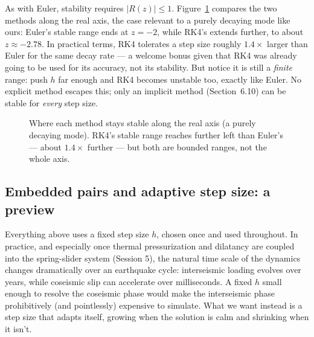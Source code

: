 As with Euler, stability requires $|R(z)|\le1$. Figure~\ref{fig:rk4-vs-euler-stability} compares the two methods along the real axis, the case relevant to a purely decaying mode like ours: Euler's stable range ends at $z=-2$, while RK4's extends further, to about $z\approx-2.78$. In practical terms, RK4 tolerates a step size roughly $1.4\times$ larger than Euler for the same decay rate --- a welcome bonus given that RK4 was already going to be used for its accuracy, not its stability. But notice it is still a \emph{finite} range: push $h$ far enough and RK4 becomes unstable too, exactly like Euler. No explicit method escapes this; only an implicit method (Section~6.10) can be stable for \emph{every} step size.

\begin{figure}[h]
\centering
{}
\caption{Where each method stays stable along the real axis (a purely decaying mode). RK4's stable range reaches further left than Euler's --- about $1.4\times$ further --- but both are bounded ranges, not the whole axis.}
\label{fig:rk4-vs-euler-stability}
\end{figure}

\subsection{Embedded pairs and adaptive step size: a preview}

Everything above uses a fixed step size $h$, chosen once and used throughout. In practice, and especially once thermal pressurization and dilatancy are coupled into the spring-slider system (Session 5), the natural time scale of the dynamics changes dramatically over an earthquake cycle: interseismic loading evolves over years, while coseismic slip can accelerate over milliseconds. A fixed $h$ small enough to resolve the coseismic phase would make the interseismic phase prohibitively (and pointlessly) expensive to simulate. What we want instead is a step size that adapts itself, growing when the solution is calm and shrinking when it isn't.

